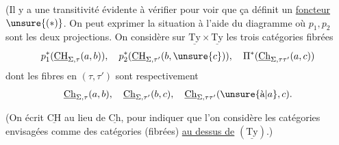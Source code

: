 (Il y a une transitivité évidente à vérifier pour voir que ça définit un \uline{foncteur} $\unsure{(*)}$. On peut exprimer la situation à l'aide du diagramme
où $p_1,p_2$ sont les deux projections. On considère sur $\underline{\mathrm{Ty}}\times \underline{\mathrm{Ty}}$ les trois catégories fibrées
\[
p_1^*(\underline{\mathrm{CH}}_{\Sigma,\tau}(a,b)),\quad
p_2^*(\underline{\mathrm{CH}}_{\Sigma,\tau'}(b,\unsure{c})),\quad
\Pi^*(\underline{\mathrm{Ch}}_{\Sigma,\tau\tau'}(a,c))
\]
dont les fibres en $(\tau,\tau')$ sont respectivement
\[
\underline{\mathrm{Ch}}_{\Sigma,\tau}(a,b),\quad
\underline{\mathrm{Ch}}_{\Sigma,\tau'}(b,c),\quad
\underline{\mathrm{Ch}}_{\Sigma,\tau\tau'}(\unsure{\text{à}|a},c).
\]

(On  écrit $\underline{\mathrm{CH}}$ au lieu de $\underline{\mathrm{Ch}}$, pour indiquer que l'on considère les catégories envisagées comme des catégories (fibrées) \uline{au dessus de} $(\underline{\mathrm{Ty}})$.)

